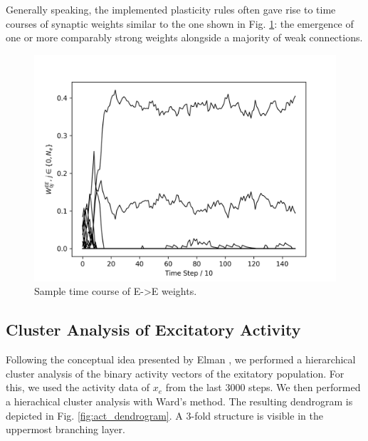\documentclass[10pt,a4paper]{article}
\begin{document}
Generally speaking, the implemented plasticity rules often gave rise to time courses of synaptic weights similar to the one shown in Fig. \ref{fig:w_ee_sample_time}: the emergence of one or more comparably strong weights alongside a majority of weak connections.

\begin{figure}
\includegraphics[width=\textwidth]{../plots/w_ee_sample_time.png}
\caption{\label{fig:w_ee_sample_time} Sample time course of E->E weights.}
\end{figure}

\subsection{Cluster Analysis of Excitatory Activity}

Following the conceptual idea presented by Elman \cite{Elman_1990}, we performed a hierarchical cluster analysis of the binary activity vectors of the exitatory population. For this, we used the activity data of $x_e$ from the last $3000$  steps. We then performed a hierachical cluster analysis with Ward's method. The resulting dendrogram is depicted in Fig. \ref{fig:act_dendrogram}. A 3-fold structure is visible in the uppermost branching layer.
\end{document}
